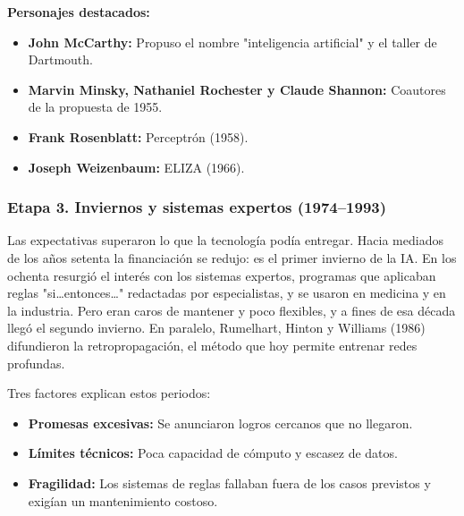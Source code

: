 \textbf{Personajes destacados:}
\begin{itemize}
    \item \textbf{John McCarthy:} Propuso el nombre "inteligencia artificial" y el taller de Dartmouth.
    \item \textbf{Marvin Minsky, Nathaniel Rochester y Claude Shannon:} Coautores de la propuesta de 1955.
    \item \textbf{Frank Rosenblatt:} Perceptrón (1958).
    \item \textbf{Joseph Weizenbaum:} ELIZA (1966).
\end{itemize}

\subsubsection{Etapa 3. Inviernos y sistemas expertos (1974--1993)}
Las expectativas superaron lo que la tecnología podía entregar. Hacia mediados de los años setenta la financiación se redujo: es el primer invierno de la IA. En los ochenta resurgió el interés con los sistemas expertos, programas que aplicaban reglas "si\dots entonces\dots" redactadas por especialistas, y se usaron en medicina y en la industria. Pero eran caros de mantener y poco flexibles, y a fines de esa década llegó el segundo invierno. En paralelo, Rumelhart, Hinton y Williams (1986) difundieron la retropropagación, el método que hoy permite entrenar redes profundas.

Tres factores explican estos periodos:
\begin{itemize}
    \item \textbf{Promesas excesivas:} Se anunciaron logros cercanos que no llegaron.
    \item \textbf{Límites técnicos:} Poca capacidad de cómputo y escasez de datos.
    \item \textbf{Fragilidad:} Los sistemas de reglas fallaban fuera de los casos previstos y exigían un mantenimiento costoso.
\end{itemize}

